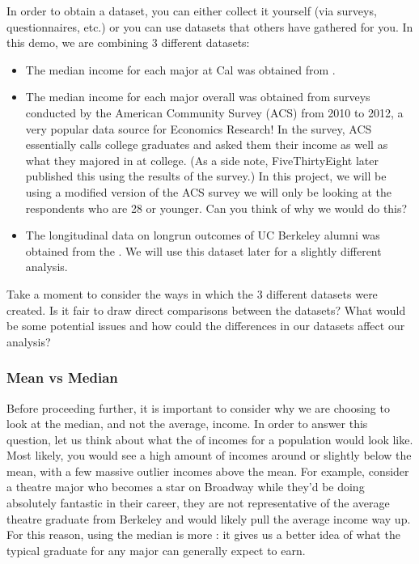 \documentclass[letterpaper,10pt,english]{jupyterBook}
\begin{document}
\sphinxAtStartPar
In order to obtain a dataset, you can either collect it yourself (via surveys, questionnaires, etc.) or you can use datasets that others have gathered for you.
In this demo, we are combining 3 different datasets:
\begin{itemize}
\item {} 
\sphinxAtStartPar
The median income for each major at Cal was obtained from .

\item {} 
\sphinxAtStartPar
The median income for each major overall was obtained from surveys conducted by the American Community Survey (ACS) from 2010 to 2012, a very popular data source for Economics Research! In the survey, ACS essentially calls college graduates and asked them their income as well as what they majored in at college. (As a side note, FiveThirtyEight later published this  using the results of the survey.) In this project, we will be using a modified version of the ACS survey \sphinxhyphen{} we will only be looking at the respondents who are 28 or younger. Can you think of why we would do this?

\item {} 
\sphinxAtStartPar
The longitudinal data on long\sphinxhyphen{}run outcomes of UC Berkeley alumni was obtained from the . We will use this dataset later for a slightly different analysis.

\end{itemize}

\sphinxAtStartPar
Take a moment to consider the ways in which the 3 different datasets were created.
Is it fair to draw direct comparisons between the datasets? What would be some potential issues and how could the differences in our datasets affect our analysis?


\subsubsection{Mean vs Median}
\label{\detokenize{content/00-intro/index:mean-vs-median}}
\sphinxAtStartPar
Before proceeding further, it is important to consider why we are choosing to look at the median, and not the average, income.
In order to answer this question, let us think about what the  of incomes for a population would look like.
Most likely, you would see a high amount of incomes around or slightly below the mean, with a few massive outlier incomes above the mean.
For example, consider a theatre major who becomes a star on Broadway \sphinxhyphen{} while they’d be doing absolutely fantastic in their career, they are not representative of the average theatre graduate from Berkeley and would likely pull the average income way up.
For this reason, using the median is more : it gives us a better idea of what the typical graduate for any major can generally expect to earn.
\end{document}
